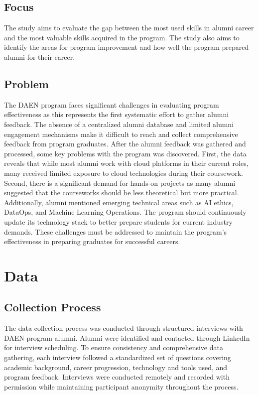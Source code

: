 \documentclass[12pt,a4paper]{article}
\begin{document}
\subsection{Focus}
The study aims to evaluate the gap between the most used skills in alumni career and the most valuable skills acquired in the program. The study also aims to identify the areas for program improvement and how well the program prepared alumni for their career.

\subsection{Problem}
The DAEN program faces significant challenges in evaluating program effectiveness as this represents the first systematic effort to gather alumni feedback. The absence of a centralized alumni database and limited alumni engagement mechanisms make it difficult to reach and collect comprehensive feedback from program graduates. After the alumni feedback was gathered and processed, some key problems with the program was discovered. First, the data reveals that while most alumni work with cloud platforms in their current roles, many received limited exposure to cloud technologies during their coursework. Second, there is a significant demand for hands-on projects as many alumni suggested that the courseworks should be less theoretical but more practical. Additionally, alumni mentioned emerging technical areas such as AI ethics, DataOps, and Machine Learning Operations. The program should continuously update its technology stack to better prepare students for current industry demands. These challenges must be addressed to maintain the program's effectiveness in preparing graduates for successful careers.

\section{Data}
\subsection{Collection Process}
The data collection process was conducted through structured interviews with DAEN program alumni. Alumni were identified and contacted through LinkedIn for interview scheduling. To ensure consistency and comprehensive data gathering, each interview followed a standardized set of questions covering academic background, career progression, technology and tools used, and program feedback. Interviews were conducted remotely and recorded with permission while maintaining participant anonymity throughout the process.
\end{document}
